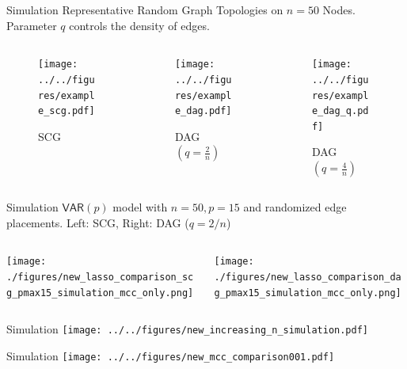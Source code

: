 \documentclass{beamer} %
\def\VAR{\mathsf{VAR}}  %
\begin{document}
\begin{frame}{Simulation}
  Representative Random Graph Topologies on $n = 50$ Nodes.  Parameter
  $q$ controls the density of edges.
  \begin{columns}
    \begin{column}{0.33\linewidth}
      \begin{figure}
        \caption{SCG}
        \texttt{[image: ../../figures/example\_scg.pdf]}
      \end{figure}
    \end{column}\pause
    \begin{column}{0.33\linewidth}
      \begin{figure}
        \caption{DAG $(q = \frac{2}{n})$}
        \texttt{[image: ../../figures/example\_dag.pdf]}
      \end{figure}
    \end{column}\pause
    \begin{column}{0.33\linewidth}
      \begin{figure}
        \caption{DAG $(q = \frac{4}{n})$}
        \texttt{[image: ../../figures/example\_dag\_q.pdf]}
      \end{figure}
    \end{column}\pause
  \end{columns}
\end{frame}

\begin{frame}{Simulation}
  $\VAR(p)$ model with $n = 50, p = 15$ and randomized edge placements.  Left: SCG, Right: DAG ($q = 2/n$)
  \begin{columns}
    \begin{column}{0.5\linewidth}
      \texttt{[image: ./figures/new\_lasso\_comparison\_scg\_pmax15\_simulation\_mcc\_only.png]}
    \end{column}

    \begin{column}{0.5\linewidth}
      \texttt{[image: ./figures/new\_lasso\_comparison\_dag\_pmax15\_simulation\_mcc\_only.png]}
    \end{column}
  \end{columns}
\end{frame}

\begin{frame}{Simulation}
  \texttt{[image: ../../figures/new\_increasing\_n\_simulation.pdf]}\pause
\end{frame}

\begin{frame}{Simulation}
  \texttt{[image: ../../figures/new\_mcc\_comparison001.pdf]}
\end{frame}
\end{document}

